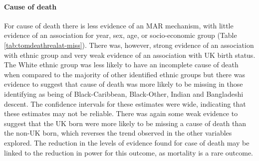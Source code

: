 \documentclass[11pt,twoside]{bristolthesis}
\begin{document}
  \hypertarget{cause-of-death}{%
  \paragraph{Cause of death}\label{cause-of-death}}
  
  For cause of death there is less evidence of an MAR mechanism, with little evidence of an association for year, sex, age, or socio-economic group (Table \ref{tab:tomdeathrealat-miss}). There was, however, strong evidence of an association with ethnic group and very weak evidence of an association with UK birth status. The White ethnic group was less likely to have an incomplete cause of death when compared to the majority of other identified ethnic groups but there was evidence to suggest that cause of death was more likely to be missing in those identifying as being of Black-Caribbean, Black-Other, Indian and Bangladeshi descent. The confidence intervals for these estimates were wide, indicating that these estimates may not be reliable. There was again some weak evidence to suggest that the UK born were more likely to be missing a cause of death than the non-UK born, which reverses the trend observed in the other variables explored. The reduction in the levels of evidence found for case of death may be linked to the reduction in power for this outcome, as mortality is a rare outcome.
  
\end{document}
